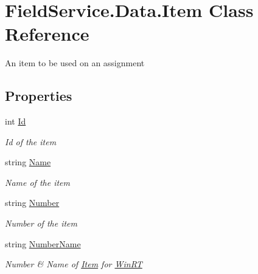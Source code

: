 \hypertarget{class_field_service_1_1_data_1_1_item}{\section{Field\+Service.\+Data.\+Item Class Reference}
\label{class_field_service_1_1_data_1_1_item}
}


An item to be used on an assignment  


\subsection*{Properties}
\begin{DoxyCompactItemize}
\item 
int \hyperlink{class_field_service_1_1_data_1_1_item_a699fbf045073eef6b09e49134de98376}{Id}
\begin{DoxyCompactList}\small\item\em Id of the item \end{DoxyCompactList}\item 
string \hyperlink{class_field_service_1_1_data_1_1_item_ac5a4663cda3b160a05d4d668b217fa9c}{Name}
\begin{DoxyCompactList}\small\item\em Name of the item \end{DoxyCompactList}\item 
string \hyperlink{class_field_service_1_1_data_1_1_item_a4a33c93b28a729bced424fe39d0e1152}{Number}
\begin{DoxyCompactList}\small\item\em Number of the item \end{DoxyCompactList}\item 
string \hyperlink{class_field_service_1_1_data_1_1_item_a8c6fcfd07611bc4c3c3a6d6abb56d644}{Number\+Name}
\begin{DoxyCompactList}\small\item\em Number \& Name of \hyperlink{class_field_service_1_1_data_1_1_item}{Item} for \hyperlink{namespace_field_service_1_1_win_r_t}{Win\+R\+T} \end{DoxyCompactList}\end{DoxyCompactItemize}



